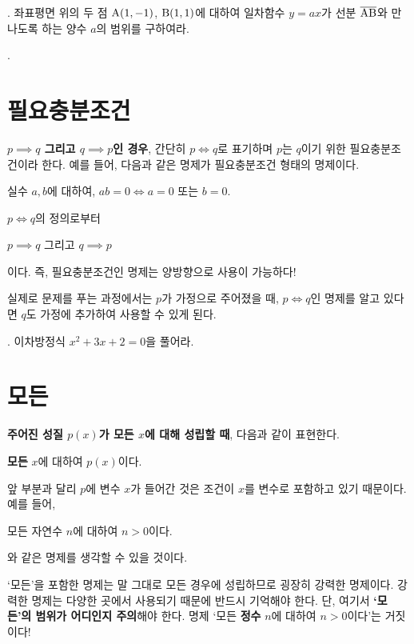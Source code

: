 \bigskip

\ex. 좌표평면 위의 두 점 \(\rm{A}(1, -1)\), \(\rm{B}(1, 1)\)에 대하여 일차함수 \(y = ax\)가 선분 \(\overline{\rm{AB}}\)와 만나도록 하는 양수 \(a\)의 범위를 구하여라.

\ex. %

\pagebreak

\section{필요충분조건}

\textbf{\(p \implies q\) 그리고 \(q \implies p\)인 경우}, 간단히 \(p \iff q\)로 표기하며 \(p\)는 \(q\)이기 위한 필요충분조건이라 한다. 예를 들어, 다음과 같은 명제가 필요충분조건 형태의 명제이다.
\begin{center}
    실수 \(a, b\)에 대하여, \(ab = 0 \iff a = 0\) 또는 \(b = 0\).
\end{center}

\(p \iff q\)의 정의로부터
\begin{center}
    \(p \implies q\) 그리고 \(q \implies p\)
\end{center}
이다. 즉, 필요충분조건인 명제는 양방향으로 사용이 가능하다!

실제로 문제를 푸는 과정에서는 \(p\)가 가정으로 주어졌을 때, \(p \iff q\)인 명제를 알고 있다면 \(q\)도 가정에 추가하여 사용할 수 있게 된다.

\bigskip

\ex. 이차방정식 \(x^2 + 3x + 2 = 0\)을 풀어라.

\pagebreak

\section{모든}

\textbf{주어진 성질 \(p(x)\)가 모든 \(x\)에 대해 성립할 때}, 다음과 같이 표현한다.
\begin{center}
    \textbf{모든} \(x\)에 대하여 \(p(x)\)이다.
\end{center}
앞 부분과 달리 \(p\)에 변수 \(x\)가 들어간 것은 조건이 \(x\)를 변수로 포함하고 있기 때문이다. 예를 들어,
\begin{center}
    모든 자연수 \(n\)에 대하여 \(n > 0\)이다.
\end{center}
와 같은 명제를 생각할 수 있을 것이다.

`모든'을 포함한 명제는 말 그대로 모든 경우에 성립하므로 굉장히 강력한 명제이다. 강력한 명제는 다양한 곳에서 사용되기 때문에 반드시 기억해야 한다. 단, 여기서 \textbf{`모든'의 범위가 어디인지 주의}해야 한다. 명제 `모든 \textbf{정수} \(n\)에 대하여 \(n > 0\)이다'는 거짓이다!

